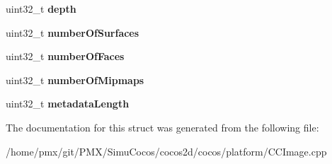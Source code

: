 \begin{DoxyCompactItemize}
\item 
\mbox{\label{structNS__CC__BEGIN_1_1____attribute_____a1d6d198ae396abffce7fdf98f5caa1e8}} 
uint32\+\_\+t {\bfseries depth}
\item 
\mbox{\label{structNS__CC__BEGIN_1_1____attribute_____a5ac3822217b1b580a37c2bd6ea925ba4}} 
uint32\+\_\+t {\bfseries number\+Of\+Surfaces}
\item 
\mbox{\label{structNS__CC__BEGIN_1_1____attribute_____a8363e8d5b042e9a6c624af6986657e72}} 
uint32\+\_\+t {\bfseries number\+Of\+Faces}
\item 
\mbox{\label{structNS__CC__BEGIN_1_1____attribute_____ae1e540d9223e26d52b6970a759ab78db}} 
uint32\+\_\+t {\bfseries number\+Of\+Mipmaps}
\item 
\mbox{\label{structNS__CC__BEGIN_1_1____attribute_____a088aad5f567205e597492fb7979d00fc}} 
uint32\+\_\+t {\bfseries metadata\+Length}
\end{DoxyCompactItemize}


The documentation for this struct was generated from the following file\+:\begin{DoxyCompactItemize}
\item 
/home/pmx/git/\+P\+M\+X/\+Simu\+Cocos/cocos2d/cocos/platform/C\+C\+Image.\+cpp\end{DoxyCompactItemize}
